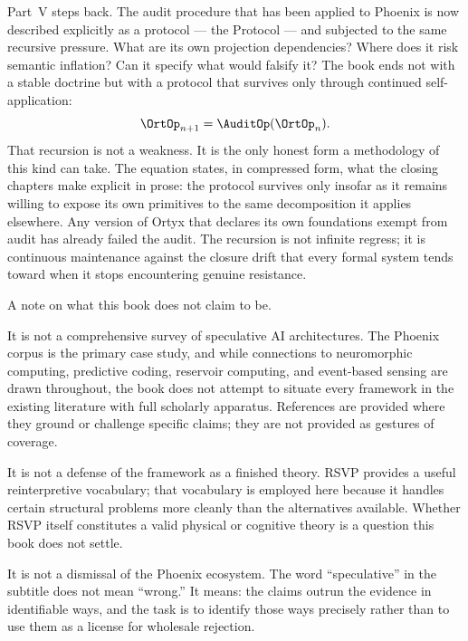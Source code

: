 Part~V steps back. The audit procedure that has been applied to
Phoenix is now described explicitly as a protocol --- the \Ortyx{}
Protocol --- and subjected to the same recursive pressure. What are
its own projection dependencies? Where does it risk semantic
inflation? Can it specify what would falsify it? The book ends not
with a stable doctrine but with a protocol that survives only through
continued self-application:
\[
  \OrtOp_{n+1} = \AuditOp(\OrtOp_n).
\]
That recursion is not a weakness. It is the only honest form a
methodology of this kind can take. The equation states, in compressed
form, what the closing chapters make explicit in prose: the protocol
survives only insofar as it remains willing to expose its own
primitives to the same decomposition it applies elsewhere. Any version
of Ortyx that declares its own foundations exempt from audit has
already failed the audit. The recursion is not infinite regress; it
is continuous maintenance against the closure drift that every formal
system tends toward when it stops encountering genuine resistance.

\medskip

A note on what this book does not claim to be.

It is not a comprehensive survey of speculative AI architectures. The
Phoenix corpus is the primary case study, and while connections to
neuromorphic computing, predictive coding, reservoir computing, and
event-based sensing are drawn throughout, the book does not attempt
to situate every framework in the existing literature with full
scholarly apparatus. References are provided where they ground or
challenge specific claims; they are not provided as gestures of
coverage.

It is not a defense of the \RSVPfull{} framework as a finished
theory. RSVP provides a useful reinterpretive vocabulary; that
vocabulary is employed here because it handles certain structural
problems more cleanly than the alternatives available. Whether RSVP
itself constitutes a valid physical or cognitive theory is a question
this book does not settle.

It is not a dismissal of the Phoenix ecosystem. The word
\enquote{speculative} in the subtitle does not mean \enquote{wrong.}
It means: the claims outrun the evidence in identifiable ways, and
the task is to identify those ways precisely rather than to use them
as a license for wholesale rejection.

